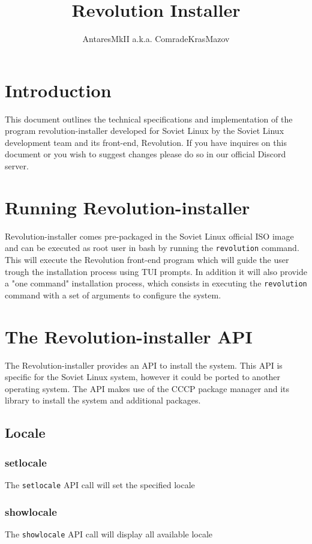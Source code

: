 \documentclass{scrartcl}
\title{Revolution Installer}
\author{AntaresMkII a.k.a. ComradeKrasMazov}
\begin{document}
\maketitle
\tableofcontents
\section{Introduction}
This document outlines the technical specifications and implementation of the
program revolution-installer developed for Soviet Linux by the Soviet Linux
development team and its front-end, Revolution. If you have inquires on this
document or you wish to suggest changes please do so in our official Discord
server.

\section{Running Revolution-installer}
Revolution-installer comes pre-packaged in the Soviet Linux official ISO image
and can be executed as root user in bash by running the \texttt{revolution}
command. This will execute the Revolution front-end program which will guide
the user trough the installation process using TUI prompts. In addition it will
also provide a "one command" installation process, which consists in executing
the \texttt{revolution} command with a set of arguments to configure the system.

\section{The Revolution-installer API}
The Revolution-installer provides an API to install the system. This API is
specific for the Soviet Linux system, however it could be ported to another
operating system. The API makes use of the CCCP package manager and its library
to install the system and additional packages.

\subsection{Locale}
\subsubsection{setlocale}
The \texttt{setlocale} API call will set the specified locale
\subsubsection{showlocale}
The \texttt{showlocale} API call will display all available locale
\end{document}
